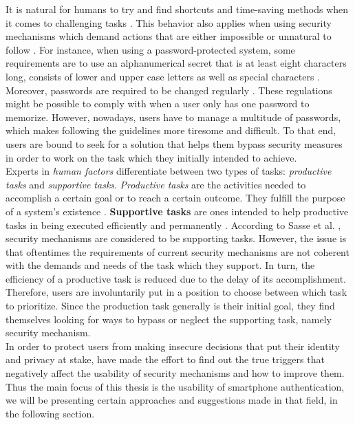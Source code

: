 It is natural for humans to try and find shortcuts and time-saving methods when it comes to challenging tasks \cite{sasse}. This behavior also applies when using security mechanisms which demand actions that are either impossible or unnatural to follow \cite{sasse}. For instance, when using a password-protected system, some requirements are to use an alphanumerical secret that is at least eight characters long, consists of lower and upper case letters as well as special characters \cite{payne, sasse}. Moreover, passwords are required to be changed regularly \cite{adams2,gorman}. These regulations might be possible to comply with when a user only has one password to memorize. However, nowadays, users have to manage a multitude of passwords, which makes following the guidelines more tiresome and difficult. To that end, users are bound to seek for a solution that helps them bypass security measures in order to work on the task which they initially intended to achieve.\\

Experts in \textit{human factors} differentiate between two types of tasks: \textit{productive tasks} and \textit{supportive tasks}. \textit{Productive tasks} are the activities needed to accomplish a certain goal or to reach a certain outcome. They fulfill the purpose of a system's existence \cite{sasse}. \textbf{Supportive tasks} are ones intended to help productive tasks in being executed efficiently and permanently \cite{sasse}. According to Sasse et al. \cite{sasse}, security mechanisms are considered to be supporting tasks. However, the issue is that oftentimes the requirements of current security mechanisms are not coherent with the demands and needs of the task which they support. In turn, the efficiency of a productive task is reduced due to the delay of its accomplishment.  Therefore, users are involuntarily put in a position to choose between which task to prioritize. Since the production task generally is their initial goal, they find themselves looking for ways to bypass or neglect the supporting task, namely security mechanism.\\

In order to protect users from making insecure decisions that put their identity and privacy at stake, have made the effort to find out the true triggers that negatively affect the usability of security mechanisms and how to improve them. Thus the main focus of this thesis is the usability of smartphone authentication, we will be presenting certain approaches and suggestions made in that field, in the following section. 

